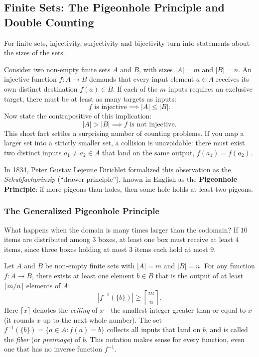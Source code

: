 \subsection{Finite Sets: The Pigeonhole Principle and Double Counting}

For finite sets, injectivity, surjectivity and bijectivity turn into statements about the sizes of the sets.

Consider two non-empty finite sets $A$ and $B$, with sizes $|A| = m$ and $|B| = n$.
An injective function $f: A \to B$ demands that every input element $a \in A$ receives its own distinct destination $f(a) \in B$. If each of the $m$ inputs requires an exclusive target, there must be at least as many targets as inputs:
\[
f \text{ is injective} \implies |A| \le |B|.
\]
Now state the contrapositive of this implication:
\[
|A| > |B| \implies f \text{ is not injective}.
\]
This short fact settles a surprising number of counting problems. If you map a larger set into a strictly smaller set, a collision is unavoidable: there must exist two distinct inputs $a_1 \neq a_2 \in A$ that land on the same output, $f(a_1) = f(a_2)$.

In 1834, Peter Gustav Lejeune Dirichlet formalized this observation as the \emph{Schubfachprinzip} (``drawer principle''), known in English as the \textbf{Pigeonhole Principle}: if more pigeons than holes, then some hole holds at least two pigeons.

\subsubsection{The Generalized Pigeonhole Principle}

What happens when the domain is many times larger than the codomain? If $10$ items are distributed among $3$ boxes, at least one box must receive at least $4$ items, since three boxes holding at most $3$ items each hold at most $9$.

\begin{theorem}
Let $A$ and $B$ be non-empty finite sets with $|A| = m$ and $|B| = n$. For any function $f: A \to B$, there exists at least one element $b \in B$ that is the output of at least $\lceil m/n \rceil$ elements of $A$:
\[
|f^{-1}(\{b\})| \ge \left\lceil \frac{m}{n} \right\rceil.
\]
Here $\lceil x \rceil$ denotes the \emph{ceiling} of $x$---the smallest integer greater than or equal to $x$ (it rounds $x$ up to the next whole number). The set $f^{-1}(\{b\}) = \{a \in A : f(a) = b\}$ collects all inputs that land on $b$, and is called the \emph{fiber} (or \emph{preimage}) of $b$. This notation makes sense for every function, even one that has no inverse function $f^{-1}$.
\end{theorem}

